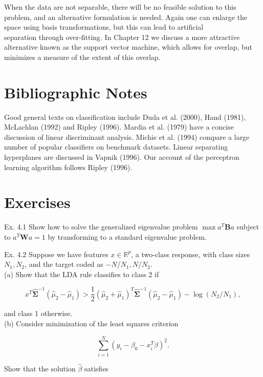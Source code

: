 \documentclass[10pt]{article}
\begin{document}
When the data are not separable, there will be no feasible solution to this problem, and an alternative formulation is needed. Again one can enlarge the space using basis transformations, but this can lead to artificial\\
separation through over-fitting. In Chapter 12 we discuss a more attractive alternative known as the support vector machine, which allows for overlap, but minimizes a measure of the extent of this overlap.

\section*{Bibliographic Notes}
Good general texts on classification include Duda et al. (2000), Hand (1981), McLachlan (1992) and Ripley (1996). Mardia et al. (1979) have a concise discussion of linear discriminant analysis. Michie et al. (1994) compare a large number of popular classifiers on benchmark datasets. Linear separating hyperplanes are discussed in Vapnik (1996). Our account of the perceptron learning algorithm follows Ripley (1996).

\section*{Exercises}
Ex. 4.1 Show how to solve the generalized eigenvalue problem $\max a^{T} \mathbf{B} a$ subject to $a^{T} \mathbf{W} a=1$ by transforming to a standard eigenvalue problem.

Ex. 4.2 Suppose we have features $x \in \mathbb{R}^{p}$, a two-class response, with class sizes $N_{1}, N_{2}$, and the target coded as $-N / N_{1}, N / N_{2}$.\\
(a) Show that the LDA rule classifies to class 2 if

$$
x^{T} \hat{\boldsymbol{\Sigma}}^{-1}\left(\hat{\mu}_{2}-\hat{\mu}_{1}\right)>\frac{1}{2}\left(\hat{\mu}_{2}+\hat{\mu}_{1}\right)^{T} \hat{\boldsymbol{\Sigma}}^{-1}\left(\hat{\mu}_{2}-\hat{\mu}_{1}\right)-\log \left(N_{2} / N_{1}\right),
$$

and class 1 otherwise.\\
(b) Consider minimization of the least squares criterion


\begin{equation*}
\sum_{i=1}^{N}\left(y_{i}-\beta_{0}-x_{i}^{T} \beta\right)^{2} . \tag{4.55}
\end{equation*}


Show that the solution $\hat{\beta}$ satisfies
\end{document}
